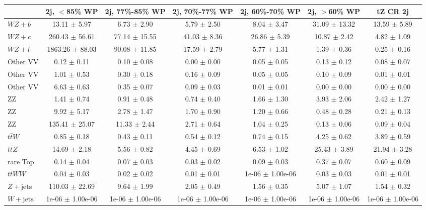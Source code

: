\begin{tabular}{|l|S|S|S|S|S|S|}
\hline 
 & {2j, $<$85\% WP} & {2j, 77\%-85\% WP} & {2j, 70\%-77\% WP} & {2j, 60\%-70\% WP} & {2j, $>$60\% WP} & {tZ CR 2j}\\
\hline 
  $WZ + b$   & 13.11 $\pm$ 5.97 & 6.73 $\pm$ 2.90 & 5.79 $\pm$ 2.50 & 8.04 $\pm$ 3.47 & 31.09 $\pm$ 13.32 & 13.59 $\pm$ 5.89 \\ 
  $WZ + c$   & 260.43 $\pm$ 56.61 & 77.14 $\pm$ 15.55 & 41.03 $\pm$ 8.36 & 26.86 $\pm$ 5.39 & 10.87 $\pm$ 2.42 & 4.82 $\pm$ 1.09 \\ 
  $WZ + l$   & 1863.26 $\pm$ 88.03 & 90.08 $\pm$ 11.85 & 17.59 $\pm$ 2.79 & 5.77 $\pm$ 1.31 & 1.39 $\pm$ 0.36 & 0.25 $\pm$ 0.16 \\ 
  Other VV   & 0.12 $\pm$ 0.11 & 0.10 $\pm$ 0.08 & 0.00 $\pm$ 0.00 & 0.05 $\pm$ 0.05 & 0.13 $\pm$ 0.12 & 0.08 $\pm$ 0.07 \\ 
  Other VV   & 1.01 $\pm$ 0.53 & 0.30 $\pm$ 0.18 & 0.16 $\pm$ 0.09 & 0.05 $\pm$ 0.05 & 0.10 $\pm$ 0.09 & 0.01 $\pm$ 0.01 \\ 
  Other VV   & 6.63 $\pm$ 0.63 & 0.35 $\pm$ 0.07 & 0.09 $\pm$ 0.03 & 0.01 $\pm$ 0.01 & 0.00 $\pm$ 0.00 & 0.00 $\pm$ 0.00 \\ 
  ZZ   & 1.41 $\pm$ 0.74 & 0.91 $\pm$ 0.48 & 0.74 $\pm$ 0.40 & 1.66 $\pm$ 1.30 & 3.93 $\pm$ 2.06 & 2.42 $\pm$ 1.27 \\ 
  ZZ   & 9.92 $\pm$ 5.17 & 2.78 $\pm$ 1.47 & 1.70 $\pm$ 0.90 & 1.20 $\pm$ 0.66 & 0.48 $\pm$ 0.28 & 0.21 $\pm$ 0.13 \\ 
  ZZ   & 135.41 $\pm$ 25.07 & 11.33 $\pm$ 2.44 & 2.71 $\pm$ 0.64 & 1.04 $\pm$ 0.25 & 0.13 $\pm$ 0.06 & 0.09 $\pm$ 0.04 \\ 
  $t\bar{t}W$   & 0.85 $\pm$ 0.18 & 0.43 $\pm$ 0.11 & 0.54 $\pm$ 0.12 & 0.74 $\pm$ 0.15 & 4.25 $\pm$ 0.62 & 3.89 $\pm$ 0.59 \\ 
  $t\bar{t}Z$   & 14.69 $\pm$ 2.18 & 5.56 $\pm$ 0.82 & 4.45 $\pm$ 0.69 & 6.53 $\pm$ 1.02 & 25.43 $\pm$ 3.89 & 21.94 $\pm$ 3.28 \\ 
  rare Top   & 0.14 $\pm$ 0.04 & 0.07 $\pm$ 0.03 & 0.03 $\pm$ 0.02 & 0.09 $\pm$ 0.03 & 0.37 $\pm$ 0.07 & 0.60 $\pm$ 0.09 \\ 
  $t\bar{t}WW$   & 0.04 $\pm$ 0.03 & 0.02 $\pm$ 0.02 & 0.01 $\pm$ 0.01 & 1e-06 $\pm$ 1.00e-06 & 0.03 $\pm$ 0.03 & 0.01 $\pm$ 0.01 \\ 
  $Z+\text{jets}$   & 110.03 $\pm$ 22.69 & 9.64 $\pm$ 1.99 & 2.05 $\pm$ 0.49 & 1.56 $\pm$ 0.35 & 5.07 $\pm$ 1.07 & 1.54 $\pm$ 0.32 \\ 
  $W+\text{jets}$   & 1e-06 $\pm$ 1.00e-06 & 1e-06 $\pm$ 1.00e-06 & 1e-06 $\pm$ 1.00e-06 & 1e-06 $\pm$ 1.00e-06 & 1e-06 $\pm$ 1.00e-06 & 1e-06 $\pm$ 1.00e-06 \\ 

\end{tabular}
